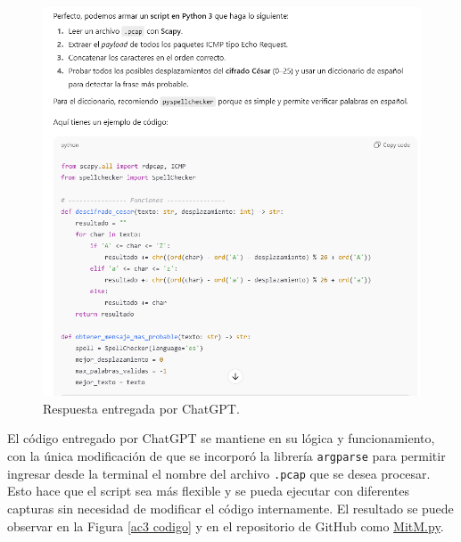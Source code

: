 \documentclass[letter,12pt]{article}
\begin{document}
\begin{figure}[H]
        \centering
        \includegraphics[width=15cm]{actividades/ac3/chatgpt_respuesta.png}
        \caption{Respuesta entregada por ChatGPT.}
        \label{ac3 respuesta chatgpt}
\end{figure}

El código entregado por ChatGPT se mantiene en su lógica y funcionamiento, con la única modificación de que se incorporó la librería \verb|argparse| para permitir ingresar desde la terminal el nombre del archivo \verb|.pcap| que se desea procesar. Esto hace que el script sea más flexible y se pueda ejecutar con diferentes capturas sin necesidad de modificar el código internamente. El resultado se puede observar en la Figura \ref{ac3 codigo} y en el repositorio de GitHub como \href{https://github.com/BrunoTrone1/cripto_lab1/blob/main/MitM.py}{MitM.py}.
\end{document}
